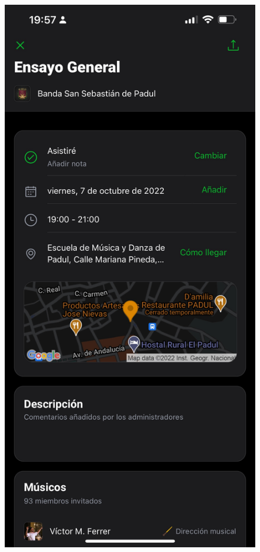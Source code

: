 \begin{figure}[h]
\endminipage\hfill
{}
  \includegraphics[width=\linewidth]{imagenes/capturas_glissandoo/IMG_0929.jpeg}

\end{figure}
